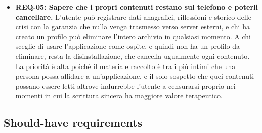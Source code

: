 \begin{itemize}
    \item \textbf{REQ-05: Sapere che i propri contenuti restano sul telefono e poterli cancellare.} L'utente può registrare dati anagrafici, riflessioni e storico delle crisi con la garanzia che nulla venga trasmesso verso server esterni, e chi ha creato un profilo può eliminare l'intero archivio in qualsiasi momento. A chi sceglie di usare l'applicazione come ospite, e quindi non ha un profilo da eliminare, resta la disinstallazione, che cancella ugualmente ogni contenuto. La priorità è alta poiché il materiale raccolto è tra i più intimi che una persona possa affidare a un'applicazione, e il solo sospetto che quei contenuti possano essere letti altrove indurrebbe l'utente a censurarsi proprio nei momenti in cui la scrittura sincera ha maggiore valore terapeutico.
\end{itemize}

\subsection{Should-have requirements}
\label{subsec:should-have}

